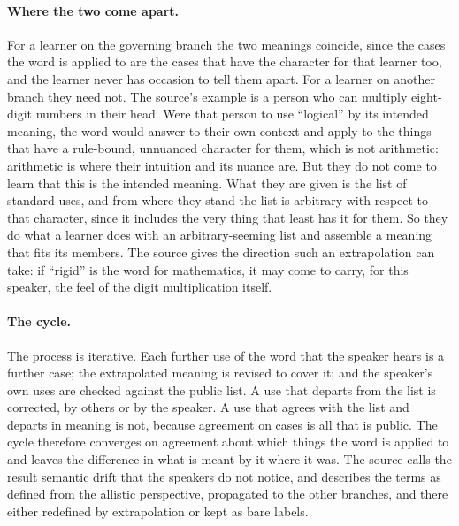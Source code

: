 \paragraph{Where the two come apart.} For a learner on the governing branch the two meanings coincide, since the cases the word is applied to are the cases that have the character for that learner too, and the learner never has occasion to tell them apart. For a learner on another branch they need not. The source's example is a person who can multiply eight-digit numbers in their head. Were that person to use ``logical'' by its intended meaning, the word would answer to their own context and apply to the things that have a rule-bound, unnuanced character for them, which is not arithmetic: arithmetic is where their intuition and its nuance are. But they do not come to learn that this is the intended meaning. What they are given is the list of standard uses, and from where they stand the list is arbitrary with respect to that character, since it includes the very thing that least has it for them. So they do what a learner does with an arbitrary-seeming list and assemble a meaning that fits its members. The source gives the direction such an extrapolation can take: if ``rigid'' is the word for mathematics, it may come to carry, for this speaker, the feel of the digit multiplication itself.

\paragraph{The cycle.} The process is iterative. Each further use of the word that the speaker hears is a further case; the extrapolated meaning is revised to cover it; and the speaker's own uses are checked against the public list. A use that departs from the list is corrected, by others or by the speaker. A use that agrees with the list and departs in meaning is not, because agreement on cases is all that is public. The cycle therefore converges on agreement about which things the word is applied to and leaves the difference in what is meant by it where it was. The source calls the result semantic drift that the speakers do not notice, and describes the terms as defined from the allistic perspective, propagated to the other branches, and there either redefined by extrapolation or kept as bare labels.

